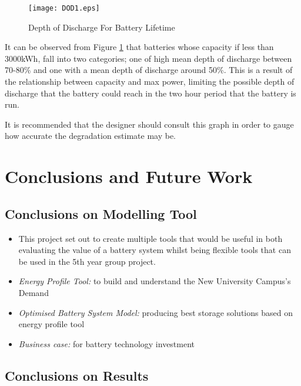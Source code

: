 \begin{figure}[H]
 \centering
 \texttt{[image: DOD1.eps]}
\caption{Depth of Discharge For Battery Lifetime}
 \label{DOD1}
 \end{figure}

It can be observed from Figure \ref{DOD1} that batteries whose capacity
if less than 3000kWh, fall into two categories; one of high mean depth
of discharge between 70-80\% and one with a mean depth of discharge
around 50\%. This is a result of the relationship between capacity and
max power, limiting the possible depth of discharge that the battery
could reach in the two hour period that the battery is run.

It is recommended that the designer should consult this graph in order
to gauge how accurate the degradation estimate may be.

\section{Conclusions and Future Work}\label{conclusions-and-future-work}

\subsection{Conclusions on Modelling
Tool}\label{conclusions-on-modelling-tool}

\begin{itemize}
\tightlist
\item
  This project set out to create multiple tools that would be useful in
  both evaluating the value of a battery system whilst being flexible
  tools that can be used in the 5th year group project.
\item
  \emph{Energy Profile Tool:} to build and understand the New University
  Campus's Demand
\item
  \emph{Optimised Battery System Model:} producing best storage
  solutions based on energy profile tool
\item
  \emph{Business case:} for battery technology investment
\end{itemize}

\subsection{Conclusions on Results}\label{conclusions-on-results}

